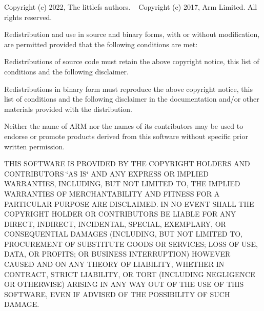 Copyright (c) 2022, The littlefs authors. ~\newline
 Copyright (c) 2017, Arm Limited. All rights reserved.

Redistribution and use in source and binary forms, with or without modification, are permitted provided that the following conditions are met\+:


\begin{DoxyItemize}
\item Redistributions of source code must retain the above copyright notice, this list of conditions and the following disclaimer.
\item Redistributions in binary form must reproduce the above copyright notice, this list of conditions and the following disclaimer in the documentation and/or other materials provided with the distribution.
\item Neither the name of A\+RM nor the names of its contributors may be used to endorse or promote products derived from this software without specific prior written permission.
\end{DoxyItemize}

T\+H\+IS S\+O\+F\+T\+W\+A\+RE IS P\+R\+O\+V\+I\+D\+ED BY T\+HE C\+O\+P\+Y\+R\+I\+G\+HT H\+O\+L\+D\+E\+RS A\+ND C\+O\+N\+T\+R\+I\+B\+U\+T\+O\+RS \char`\"{}\+A\+S I\+S\char`\"{} A\+ND A\+NY E\+X\+P\+R\+E\+SS OR I\+M\+P\+L\+I\+ED W\+A\+R\+R\+A\+N\+T\+I\+ES, I\+N\+C\+L\+U\+D\+I\+NG, B\+UT N\+OT L\+I\+M\+I\+T\+ED TO, T\+HE I\+M\+P\+L\+I\+ED W\+A\+R\+R\+A\+N\+T\+I\+ES OF M\+E\+R\+C\+H\+A\+N\+T\+A\+B\+I\+L\+I\+TY A\+ND F\+I\+T\+N\+E\+SS F\+OR A P\+A\+R\+T\+I\+C\+U\+L\+AR P\+U\+R\+P\+O\+SE A\+RE D\+I\+S\+C\+L\+A\+I\+M\+ED. IN NO E\+V\+E\+NT S\+H\+A\+LL T\+HE C\+O\+P\+Y\+R\+I\+G\+HT H\+O\+L\+D\+ER OR C\+O\+N\+T\+R\+I\+B\+U\+T\+O\+RS BE L\+I\+A\+B\+LE F\+OR A\+NY D\+I\+R\+E\+CT, I\+N\+D\+I\+R\+E\+CT, I\+N\+C\+I\+D\+E\+N\+T\+AL, S\+P\+E\+C\+I\+AL, E\+X\+E\+M\+P\+L\+A\+RY, OR C\+O\+N\+S\+E\+Q\+U\+E\+N\+T\+I\+AL D\+A\+M\+A\+G\+ES (I\+N\+C\+L\+U\+D\+I\+NG, B\+UT N\+OT L\+I\+M\+I\+T\+ED TO, P\+R\+O\+C\+U\+R\+E\+M\+E\+NT OF S\+U\+B\+S\+T\+I\+T\+U\+TE G\+O\+O\+DS OR S\+E\+R\+V\+I\+C\+ES; L\+O\+SS OF U\+SE, D\+A\+TA, OR P\+R\+O\+F\+I\+TS; OR B\+U\+S\+I\+N\+E\+SS I\+N\+T\+E\+R\+R\+U\+P\+T\+I\+ON) H\+O\+W\+E\+V\+ER C\+A\+U\+S\+ED A\+ND ON A\+NY T\+H\+E\+O\+RY OF L\+I\+A\+B\+I\+L\+I\+TY, W\+H\+E\+T\+H\+ER IN C\+O\+N\+T\+R\+A\+CT, S\+T\+R\+I\+CT L\+I\+A\+B\+I\+L\+I\+TY, OR T\+O\+RT (I\+N\+C\+L\+U\+D\+I\+NG N\+E\+G\+L\+I\+G\+E\+N\+CE OR O\+T\+H\+E\+R\+W\+I\+SE) A\+R\+I\+S\+I\+NG IN A\+NY W\+AY O\+UT OF T\+HE U\+SE OF T\+H\+IS S\+O\+F\+T\+W\+A\+RE, E\+V\+EN IF A\+D\+V\+I\+S\+ED OF T\+HE P\+O\+S\+S\+I\+B\+I\+L\+I\+TY OF S\+U\+CH D\+A\+M\+A\+GE. 
